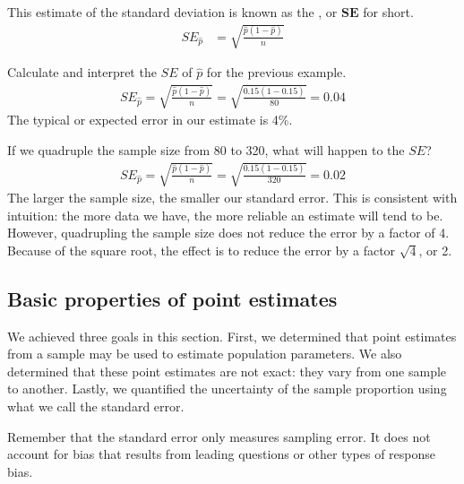 This estimate of the standard deviation is known as the , or $\pmb{SE}$ for short.
\begin{align*}
SE_{\hat{p}}&=\sqrt{\frac{\hat{p}(1-\hat{p})}{n}}
\end{align*}

\begin{examplewrap}
\begin{nexample}{Calculate and interpret the $SE$ of $\hat{p}$ for the previous example.}
\begin{align*}
SE_{\hat{p}}=\sqrt{\frac{\hat{p}(1-\hat{p})}{n}} =\sqrt{\frac{0.15(1-0.15)}{80}}=0.04
\end{align*}
The typical or expected error in our estimate is 4\%.
\end{nexample}
\end{examplewrap}

\begin{examplewrap}
\begin{nexample}{If we quadruple the sample size from 80 to 320, what will happen to the $SE$?}
\begin{align*}
SE_{\hat{p}}=\sqrt{\frac{\hat{p}(1-\hat{p})}{n}} =\sqrt{\frac{0.15(1-0.15)}{320}}=0.02
\end{align*}
The larger the sample size, the smaller our standard error. This is consistent with intuition: the more data we have, the more reliable an estimate will tend to be. However, quadrupling the sample size does not reduce the error by a factor of 4. Because of the square root, the effect is to reduce the error by a factor $\sqrt{4}$, or 2. 
\end{nexample}
\end{examplewrap}


\subsection{Basic properties of point estimates}

We achieved three goals in this section. First, we determined that point estimates from a sample may be used to estimate population parameters. We also determined that these point estimates are not exact: they vary from one sample to another. Lastly, we quantified the uncertainty of the sample proportion using what we  call the standard error. 

Remember that the standard error only measures sampling error.  It does not account for bias that results from leading questions or other types of response bias.

